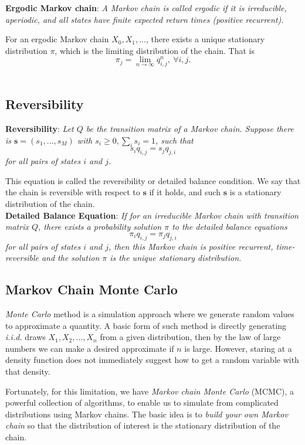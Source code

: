 \documentclass{progartcn}
\begin{document}
		\textbf{Ergodic Markov chain}: \textit{A Markov chain is called ergodic if it is irreducible, aperiodic, and all states have finite expected return times (positive recurrent).}

		For an ergodic Markov chain $X_0,X_1,...$, there exists a unique stationary distribution $\pi$, which is the limiting distribution of the chain. That is
		\[\pi_j=\lim_{n\to\infty} q_{i,j}^n,\ \forall i,j.\]\
		
	\subsection{Reversibility}

		\textbf{Reversibility}: \textit{Let $Q$ be the transition matrix of a Markov chain. Suppose there is $\mathbf{s} = (s_1,...,s_M)$ with $s_i\ge0,\sum_i s_i=1$, such that}
		\[s_iq_{i,j}=s_jq_{j,i}\]
		\textit{for all pairs of states $i$ and $j$.}

		This equation is called the reversibility or detailed balance condition. We say that the chain is reversible with respect to $\mathbf{s}$ if it holds, and such $\mathbf{s}$ is a stationary distribution of the chain.\\

		\textbf{Detailed Balance Equation}: \textit{If for an irreducible Markov chain with transition matrix $Q$, there exists a probability solution $\pi$ to the detailed balance equations}
		\[\pi_i q_{i,j}=\pi_j q_{j,i}\]
		\textit{for all pairs of states $i$ and $j$, then this Markov chain is positive recurrent, time-reversible and the solution $\pi$ is the unique stationary distribution.}\\

	\subsection{Markov Chain Monte Carlo}

		\textit{Monte Carlo} method is a simulation approach where we generate random values to approximate a quantity. A basic form of such method is directly generating \textit{i.i.d.} draws $X_1,X_2,..., X_n$ from a given distribution, then by the law of large numbers we can make a desired approximate if $n$ is large. However, staring at a density function does not immediately suggest how to get a random variable with that density.

		Fortunately, for this limitation, we have \textit{Markov chain Monte Carlo} (MCMC), a powerful collection of algorithms, to enable us to simulate from complicated distributions using Markov chains. The basic idea is to \textit{build your own Markov chain} so that the distribution of interest is the stationary distribution of the chain.\\
\end{document}
